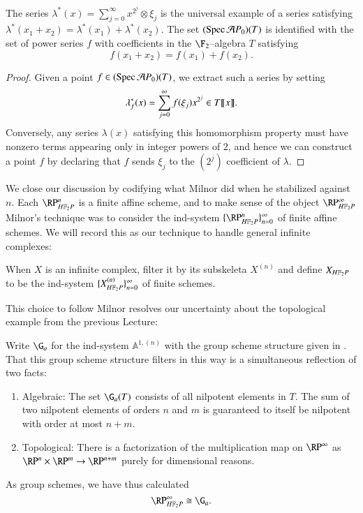 \begin{lemma}\label{SteenrodAlgIdentifiedWithAutGa}
The series $\lambda^*(x) = \sum_{j=0}^\infty x^{2^j} \otimes \xi_j$ is the universal example of a series satisfying $\lambda^*(x_1 + x_2) = \lambda^*(x_1) + \lambda^*(x_2)$.  The set $(\operatorname{Spec} \mathcal AP_0)(T)$ is identified with the set of power series $f$ with coefficients in the $\F_2$--algebra $T$ satisfying \[f(x_1 + x_2) = f(x_1) + f(x_2).\]
\end{lemma}
\begin{proof}
Given a point $f \in (\operatorname{Spec} \mathcal AP_0)(T)$, we extract such a series by setting \[\lambda^*_f(x) = \sum_{j=0}^\infty f(\xi_j) x^{2^j} \in T\llbracket{x}\rrbracket.\]  Conversely, any series $\lambda(x)$ satisfying this homomorphism property must have nonzero terms appearing only in integer powers of $2$, and hence we can construct a point $f$ by declaring that $f$ sends $\xi_j$ to the $(2^j)${\th} coefficient of $\lambda$.
\end{proof}

We close our discussion by codifying what Milnor did when he stabilized against $n$.  Each $\RP^n_{\HFtwo P}$ is a finite affine scheme, and to make sense of the object $\RP^\infty_{\HFtwo P}$ Milnor's technique was to consider the ind-system $\{\RP^n_{\HFtwo P}\}_{n=0}^\infty$ of finite affine schemes.  We will record this as our technique to handle general infinite complexes:
\begin{definition}\label{FullDefnOfXHF2}
When $X$ is an infinite complex, filter it by its subskeleta $X^{(n)}$ and define $X_{\HFtwo P}$ to be the ind-system $\{X^{(n)}_{\HFtwo P}\}_{n=0}^\infty$ of finite schemes.
\end{definition}

This choice to follow Milnor resolves our uncertainty about the topological example from the previous Lecture:
\begin{example}\label{RPinftyExampleForReal}
Write $\G_a$ for the ind-system $\mathbb A^{1, (n)}$ with the group scheme structure given in .  That this group scheme structure filters in this way is a simultaneous reflection of two facts:
\begin{enumerate}
\item Algebraic: The set $\G_a(T)$ consists of all nilpotent elements in $T$.  The sum of two nilpotent elements of orders $n$ and $m$ is guaranteed to itself be nilpotent with order at most $n+m$.
\item Topological: There is a factorization of the multiplication map on $\RP^\infty$ as $\RP^n \times \RP^m \to \RP^{n+m}$ purely for dimensional reasons.
\end{enumerate}
As group schemes, we have thus calculated \[\RP^\infty_{\HFtwo P} \cong \G_a.\]
\end{example}


